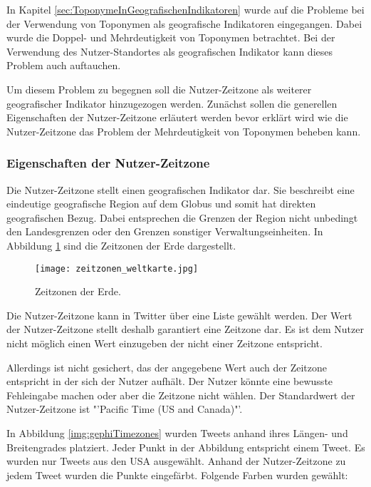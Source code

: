 			In Kapitel \ref{sec:ToponymeInGeografischenIndikatoren} wurde auf die Probleme bei der Verwendung von Toponymen als geografische Indikatoren eingegangen.
			Dabei wurde die Doppel- und Mehrdeutigkeit von Toponymen betrachtet.
			Bei der Verwendung des Nutzer-Standortes als geografischen Indikator kann dieses Problem auch auftauchen. 

			Um diesem Problem zu begegnen soll die Nutzer-Zeitzone als weiterer geografischer Indikator hinzugezogen werden.
			Zunächst sollen die generellen Eigenschaften der Nutzer-Zeitzone erläutert werden bevor erklärt wird wie die Nutzer-Zeitzone das Problem der Mehrdeutigkeit von Toponymen beheben kann.

			\subsubsection{Eigenschaften der Nutzer-Zeitzone}

				Die Nutzer-Zeitzone stellt einen geografischen Indikator dar.
				Sie beschreibt eine eindeutige geografische Region auf dem Globus und somit hat direkten geografischen Bezug.
				Dabei entsprechen die Grenzen der Region nicht unbedingt den Landesgrenzen oder den Grenzen sonstiger Verwaltungseinheiten. 
				In Abbildung \ref{img:timezones} sind die Zeitzonen der Erde dargestellt.

				\begin{figure}[h!]
					\begin{center}
						\texttt{[image: zeitzonen\_weltkarte.jpg]}
						\caption{Zeitzonen der Erde.}
						\label{img:timezones}
					\end{center}
				\end{figure}	

				Die Nutzer-Zeitzone kann in Twitter über eine Liste gewählt werden.
				Der Wert der Nutzer-Zeitzone stellt deshalb garantiert eine Zeitzone dar.
				Es ist dem Nutzer nicht möglich einen Wert einzugeben der nicht einer Zeitzone entspricht.

				Allerdings ist nicht gesichert, das der angegebene Wert auch der Zeitzone entspricht in der sich der Nutzer aufhält.
				Der Nutzer könnte eine bewusste Fehleingabe machen oder aber die Zeitzone nicht wählen.
				Der Standardwert der Nutzer-Zeitzone ist "'Pacific Time (US and Canada)"'.

				In Abbildung \ref{img:gephiTimezones} wurden Tweets anhand ihres Längen- und Breitengrades platziert.
				Jeder Punkt in der Abbildung entspricht einem Tweet.
				Es wurden nur Tweets aus den USA ausgewählt.
				Anhand der Nutzer-Zeitzone zu jedem Tweet wurden die Punkte eingefärbt.
				Folgende Farben wurden gewählt:

